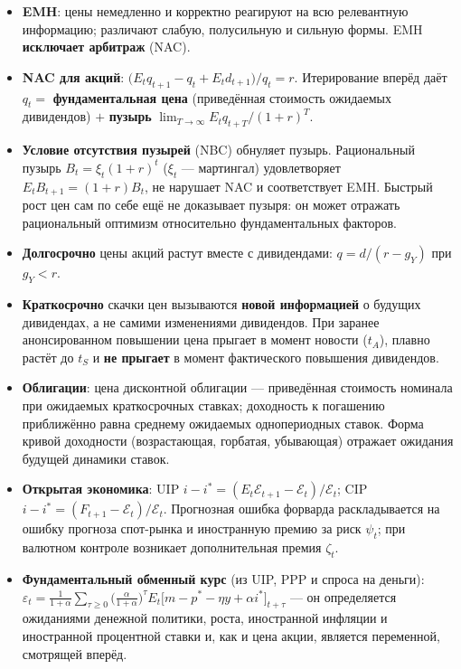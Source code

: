 \documentclass[10pt,a4paper]{article}
\begin{document}
\begin{itemize}[leftmargin=1.3em]
\item \textbf{EMH}: цены немедленно и корректно реагируют на всю релевантную информацию; различают слабую, полусильную и сильную формы. EMH \textbf{исключает арбитраж} (NAC).
\item \textbf{NAC для акций}: $\big(E_tq_{t+1}-q_t+E_td_{t+1}\big)/q_t=r$. Итерирование вперёд даёт $q_t=$ \textbf{фундаментальная цена} (приведённая стоимость ожидаемых дивидендов) $+$ \textbf{пузырь} $\lim_{T\to\infty}E_tq_{t+T}/(1+r)^T$.
\item \textbf{Условие отсутствия пузырей} (NBC) обнуляет пузырь. Рациональный пузырь $B_t=\xi_t(1+r)^t$ ($\xi_t$ — мартингал) удовлетворяет $E_tB_{t+1}=(1+r)B_t$, не нарушает NAC и соответствует EMH. Быстрый рост цен сам по себе ещё не доказывает пузыря: он может отражать рациональный оптимизм относительно фундаментальных факторов.
\item \textbf{Долгосрочно} цены акций растут вместе с дивидендами: $q=d/(r-g_Y)$ при $g_Y<r$.
\item \textbf{Краткосрочно} скачки цен вызываются \textbf{новой информацией} о будущих дивидендах, а не самими изменениями дивидендов. При заранее анонсированном повышении цена прыгает в момент новости ($t_A$), плавно растёт до $t_S$ и \textbf{не прыгает} в момент фактического повышения дивидендов.
\item \textbf{Облигации}: цена дисконтной облигации — приведённая стоимость номинала при ожидаемых краткосрочных ставках; доходность к погашению приближённо равна среднему ожидаемых однопериодных ставок. Форма кривой доходности (возрастающая, горбатая, убывающая) отражает ожидания будущей динамики ставок.
\item \textbf{Открытая экономика}: UIP $i-i^{*}=(E_t\mathcal{E}_{t+1}-\mathcal{E}_t)/\mathcal{E}_t$; CIP $i-i^{*}=(F_{t+1}-\mathcal{E}_t)/\mathcal{E}_t$. Прогнозная ошибка форварда раскладывается на ошибку прогноза спот-рынка и иностранную премию за риск $\psi_t$; при валютном контроле возникает дополнительная премия $\zeta_t$.
\item \textbf{Фундаментальный обменный курс} (из UIP, PPP и спроса на деньги): $\varepsilon_t=\frac{1}{1+\alpha}\sum_{\tau\ge0}\big(\frac{\alpha}{1+\alpha}\big)^\tau E_t\big[m-p^{*}-\eta y+\alpha i^{*}\big]_{t+\tau}$ — он определяется ожиданиями денежной политики, роста, иностранной инфляции и иностранной процентной ставки и, как и цена акции, является переменной, смотрящей вперёд.
\end{itemize}
\end{document}
